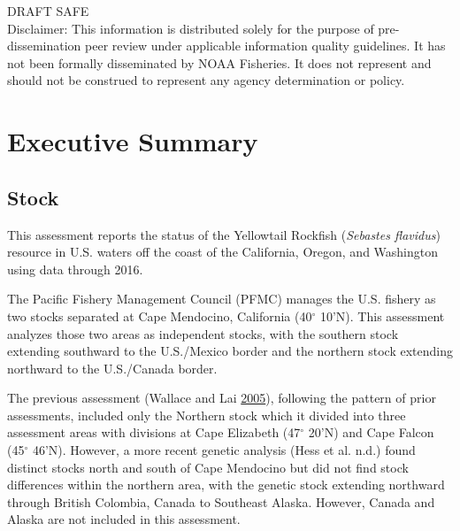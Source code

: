 \documentclass[12pt,]{article}
\begin{document}
\begin{center}
\vfill
DRAFT SAFE\\
Disclaimer: This information is distributed solely for the purpose of pre-dissemination
peer review under applicable information quality guidelines. It has not been formally
disseminated by NOAA Fisheries. It does not represent and should not be construed to
represent any agency determination or policy. 

\vspace{.3cm}

\maketitle

\setcounter{page}{1}
\end{center}

{
\setcounter{tocdepth}{4}
\tableofcontents
}
\setlength{\parskip}{5mm plus1mm minus1mm} \pagebreak

 \setcounter{page}{1}
\renewcommand{\thefigure}{\alph{figure}}
\renewcommand{\thetable}{\alph{table}}

\section*{Executive Summary}\label{executive-summary}

\subsection*{Stock}\label{stock}

This assessment reports the status of the Yellowtail Rockfish
(\emph{Sebastes flavidus}) resource in U.S. waters off the coast of the
California, Oregon, and Washington using data through 2016.

The Pacific Fishery Management Council (PFMC) manages the U.S. fishery
as two stocks separated at Cape Mendocino, California (40\(^\circ\)
10'N). This assessment analyzes those two areas as independent stocks,
with the southern stock extending southward to the U.S./Mexico border
and the northern stock extending northward to the U.S./Canada border.

The previous assessment (Wallace and Lai
\protect\hyperlink{ref-Wallace2005}{2005}), following the pattern of
prior assessments, included only the Northern stock which it divided
into three assessment areas with divisions at Cape Elizabeth
(47\(^\circ\) 20'N) and Cape Falcon (45\(^\circ\) 46'N). However, a more
recent genetic analysis (Hess et al. n.d.) found distinct stocks north
and south of Cape Mendocino but did not find stock differences within
the northern area, with the genetic stock extending northward through
British Colombia, Canada to Southeast Alaska. However, Canada and Alaska
are not included in this assessment.
\end{document}
